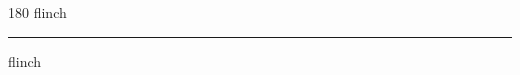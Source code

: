 
\begin{frame}
\begin{center}
\begin{turn}{180}
{\fontsize{2.5cm}{1em}\selectfont flinch}
\end{turn}
\vspace{1em}\par  
\hrule
\vspace{1em}\par  
{\fontsize{2.5cm}{1em}\selectfont flinch}
\end{center}
\end{frame}
